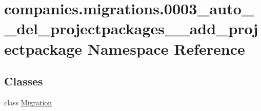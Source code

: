 \hypertarget{namespacecompanies_1_1migrations_1_10003__auto____del__projectpackages____add__projectpackage}{\section{companies.\-migrations.0003\-\_\-auto\-\_\-\-\_\-del\-\_\-projectpackages\-\_\-\-\_\-add\-\_\-projectpackage Namespace Reference}
\label{namespacecompanies_1_1migrations_1_10003__auto____del__projectpackages____add__projectpackage}
}
\subsection*{Classes}
\begin{DoxyCompactItemize}
\item 
class \hyperlink{classcompanies_1_1migrations_1_10003__auto____del__projectpackages____add__projectpackage_1_1_migration}{Migration}
\end{DoxyCompactItemize}
